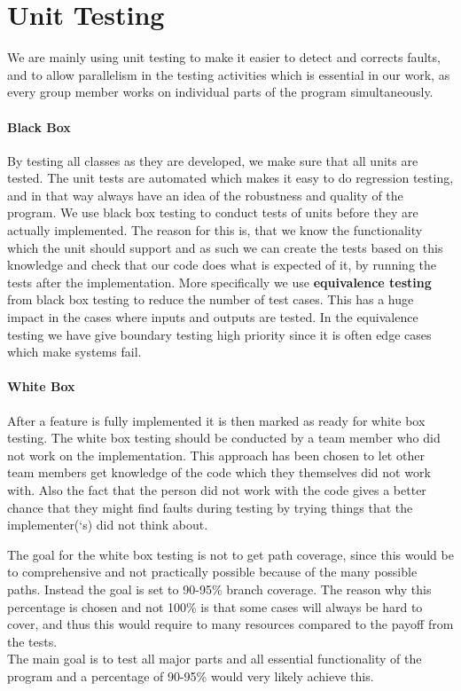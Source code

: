 \section{Unit Testing}
We are mainly using unit testing to make it easier to detect and corrects faults, and to allow parallelism in the testing activities which is essential in our work, as every group member works on individual parts of the program simultaneously.

\paragraph{Black Box}
By testing all classes as they are developed, we make sure that all units are tested. The unit tests are automated which makes it easy to do regression testing, and in that way always have an idea of the robustness and quality of the program.
We use black box testing to conduct tests of units before they are actually implemented. The reason for this is, that we know the functionality which the unit should support and as such we can create the tests based on this knowledge and check that our code does what is expected of it, by running the tests after the implementation.
More specifically we use \textbf{equivalence testing} from black box testing to reduce the number of test cases. This has a huge impact in the cases where inputs and outputs are tested. In the equivalence testing we have give boundary testing high priority since it is often edge cases which make systems fail.

\paragraph{White Box}
After a feature is fully implemented it is then marked as ready for white box testing. The white box testing should be conducted by a team member who did not work on the implementation. This approach has been chosen to let other team members get knowledge of the code which they themselves did not work with. Also the fact that the person did not work with the code gives a better chance that they might find faults during testing by trying things that the implementer(`s) did not think about.

 The goal for the white box testing is not to get path coverage, since this would be to comprehensive and not practically possible because of the many possible paths. Instead the goal is set to 90-95\% branch coverage. The reason why this percentage is chosen and not 100\% is that some cases will always be hard to cover, and thus this would require to many resources compared to the payoff from the tests. \\
 The main goal is to test all major parts and all essential functionality of the program and a percentage of 90-95\% would very likely achieve this.
 
